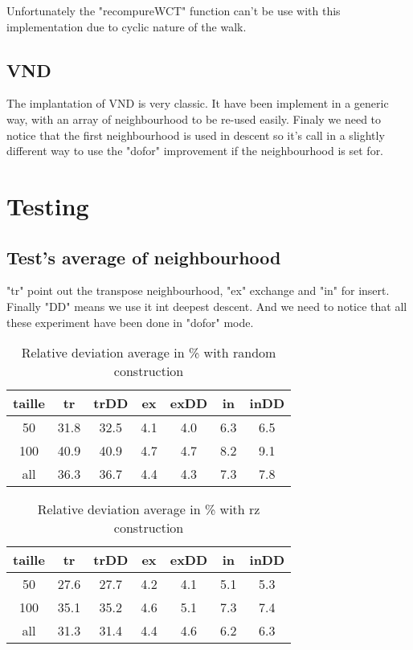 \documentclass[12pt,a4paper]{article}
\begin{document}
Unfortunately the "recompureWCT" function can't be use with this implementation due to cyclic nature of the walk.

\subsection{VND}

The implantation of VND is very classic. It have been implement in a generic way, with an array of neighbourhood to be re-used easily. Finaly we need to notice that the first neighbourhood is used in descent so it's call in a slightly different way to use the "dofor" improvement if the neighbourhood is set for.

\section{Testing}

\subsection{Test's average of neighbourhood}

"tr" point out the transpose neighbourhood, "ex" exchange and "in" for insert. Finally "DD" means we use it int deepest descent. And we need to notice that all these experiment have been done in "dofor" mode.

\begin{table}[!h]
\centering
\begin{tabular}{|*{7}{c|}}
  \hline
  taille & tr & trDD & ex & exDD & in & inDD \\
  \hline
  50 & 31.8 & 32.5 & 4.1 & 4.0 & 6.3 & 6.5 \\ 
  100 & 40.9 & 40.9 & 4.7 & 4.7 & 8.2 & 9.1 \\
  all & 36.3 & 36.7 & 4.4 & 4.3 & 7.3 & 7.8 \\
  \hline
\end{tabular}
\caption{Relative deviation average in \% with random construction}
\label{Relative deviation with random construction}
\end{table}

\begin{table}[!h]
\centering
\begin{tabular}{|*{7}{c|}}
  \hline
  taille & tr & trDD & ex & exDD & in & inDD \\
  \hline
  50 & 27.6 & 27.7 & 4.2 & 4.1 & 5.1 & 5.3 \\ 
  100 & 35.1 & 35.2 & 4.6 & 5.1 & 7.3 & 7.4 \\
  all & 31.3 & 31.4 & 4.4 & 4.6 & 6.2 & 6.3 \\
  \hline
\end{tabular}
\caption{Relative deviation average in \% with rz construction}
\label{Relative deviation with rz construction}
\end{table}
\end{document}
